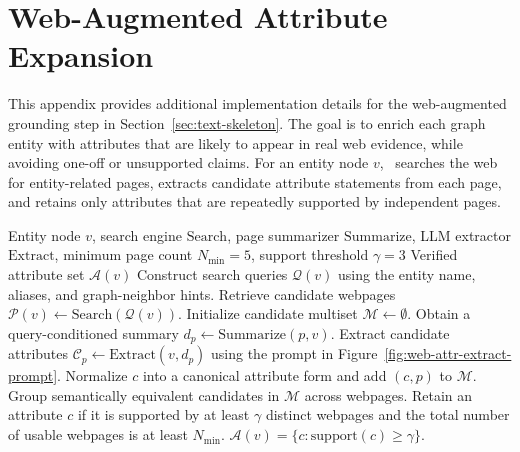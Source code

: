\section{Web-Augmented Attribute Expansion}
\label{app:web-attribute-expansion}

This appendix provides additional implementation details for the web-augmented grounding step in Section~\ref{sec:text-skeleton}. The goal is to enrich each graph entity with attributes that are likely to appear in real web evidence, while avoiding one-off or unsupported claims. For an entity node $v$, \modelname\ searches the web for entity-related pages, extracts candidate attribute statements from each page, and retains only attributes that are repeatedly supported by independent pages.

\begin{algorithm}[H]
\caption{Web-Augmented Attribute Expansion for an Entity Node}
\label{alg:web-attribute-expansion}
\begin{algorithmic}[1]
\Require Entity node $v$, search engine $\mathrm{Search}$, page summarizer $\mathrm{Summarize}$, LLM extractor $\mathrm{Extract}$, minimum page count $N_{\min}=5$, support threshold $\gamma=3$
\Ensure Verified attribute set $\mathcal{A}(v)$
\State Construct search queries $\mathcal{Q}(v)$ using the entity name, aliases, and graph-neighbor hints.
\State Retrieve candidate webpages $\mathcal{P}(v)\leftarrow \mathrm{Search}(\mathcal{Q}(v))$.
\State Initialize candidate multiset $\mathcal{M}\leftarrow \emptyset$.
    \State Obtain a query-conditioned summary $d_p\leftarrow \mathrm{Summarize}(p,v)$.
    \State Extract candidate attributes $\mathcal{C}_p\leftarrow \mathrm{Extract}(v,d_p)$ using the prompt in Figure~\ref{fig:web-attr-extract-prompt}.
            \State Normalize $c$ into a canonical attribute form and add $(c,p)$ to $\mathcal{M}$.
        \EndIf
    \EndFor
\EndFor
\State Group semantically equivalent candidates in $\mathcal{M}$ across webpages.
\State Retain an attribute $c$ if it is supported by at least $\gamma$ distinct webpages and the total number of usable webpages is at least $N_{\min}$.
\State \Return $\mathcal{A}(v)=\{c: \mathrm{support}(c)\geq \gamma\}$.
\end{algorithmic}
\end{algorithm}

